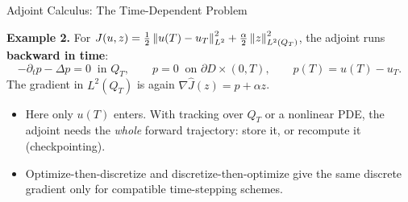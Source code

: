 \documentclass[main.tex]{subfiles}
\begin{document}
\begin{frame}{Adjoint Calculus: The Time-Dependent Problem}
  \begin{hlbox}
    \textbf{Example 2.} For $J(u,z) = \tfrac12\left\lVert u(T) - u_T \right\rVert_{L^2}^2 + \tfrac{\alpha}{2}\left\lVert z \right\rVert_{L^2(Q_T)}^2$, the adjoint runs \textbf{backward in time}:
    \[
      -\partial_t p - \Delta p = 0 \;\;\text{in } Q_T, \qquad p = 0 \;\;\text{on } \partial D\times(0,T), \qquad p(T) = u(T) - u_T .
    \]
    The gradient in $L^2(Q_T)$ is again $\nabla\hat J(z) = p + \alpha z$.
  \end{hlbox}

  \begin{hlbox}
    \begin{itemize}
      \item Here only $u(T)$ enters. With tracking over $Q_T$ or a nonlinear PDE, the adjoint needs the \emph{whole} forward trajectory: store it, or recompute it (checkpointing).
      \item Optimize-then-discretize and discretize-then-optimize give the same discrete gradient only for compatible time-stepping schemes.
    \end{itemize}
  \end{hlbox}
  \vfill\hfill\hyperlink{hessian<3>}{}
\end{frame}
\end{document}
